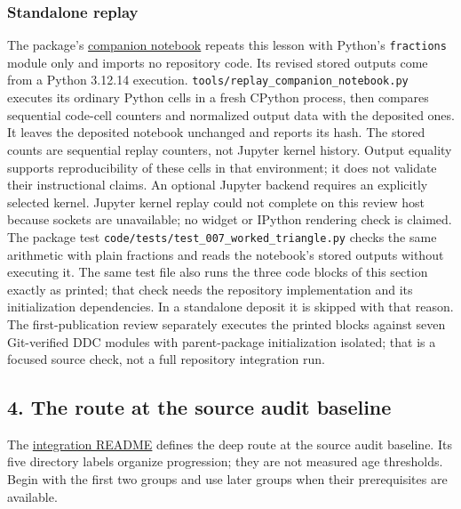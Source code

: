 \documentclass[
  11pt,
]{article}
\newcommand{\passthrough}[1]{#1}
\begin{document}
\hypertarget{standalone-replay}{%
\subsubsection{Standalone replay}\label{standalone-replay}}

The package's
\href{jupyter_notebooks/007_moving_a_discrepancy.ipynb}{companion
notebook} repeats this lesson with Python's
\passthrough{\lstinline!fractions!} module only and imports no
repository code. Its revised stored outputs come from a Python 3.12.14
execution.
\texttt{\nolinkurl{tools/replay_companion_notebook.py}} executes
its ordinary Python cells in a fresh CPython process, then compares
sequential code-cell counters and normalized output data with the
deposited ones. It leaves the deposited notebook unchanged and reports
its hash. The stored counts are sequential replay counters, not Jupyter
kernel history. Output equality supports reproducibility of these cells
in that environment; it does not validate their instructional claims. An
optional Jupyter backend requires an explicitly selected kernel. Jupyter
kernel replay could not complete on this review host because sockets are
unavailable; no widget or IPython rendering check is claimed. The
package test
\texttt{\nolinkurl{code/tests/test_007_worked_triangle.py}}
checks the same arithmetic with plain fractions and reads the notebook's
stored outputs without executing it. The same test file also runs the
three code blocks of this section exactly as printed; that check needs
the repository implementation and its initialization dependencies. In a
standalone deposit it is skipped with that reason. The first-publication
review separately executes the printed blocks against seven Git-verified
DDC modules with parent-package initialization isolated; that is a
focused source check, not a full repository integration run.

\hypertarget{the-route-at-the-source-audit-baseline}{%
\subsection{4. The route at the source audit
baseline}\label{the-route-at-the-source-audit-baseline}}

The
\href{https://github.com/dbccpage/the_symbol_game/blob/52cb5457f6c485ba548cfd292f6012a941ed22cf/omega_engine_education/the_symbol_game/lessons/system_integration/README.md}{integration
README} defines the deep route at the source audit baseline. Its five
directory labels organize progression; they are not measured age
thresholds. Begin with the first two groups and use later groups when
their prerequisites are available.
\end{document}
